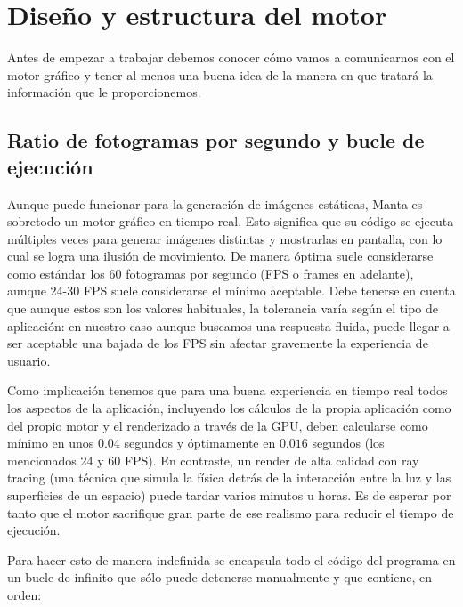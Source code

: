 \section{Diseño y estructura del motor}

Antes de empezar a trabajar debemos conocer cómo vamos a comunicarnos con el motor gráfico y tener al menos una buena idea de la manera en que tratará la información que le proporcionemos.

\subsection{Ratio de fotogramas por segundo y bucle de ejecución}
\label{fps_bucle_ejecucion}
Aunque puede funcionar para la generación de imágenes estáticas, Manta es sobretodo un motor gráfico en tiempo real. Esto significa que su código se ejecuta múltiples veces para generar imágenes distintas y mostrarlas en pantalla, con lo cual se logra una ilusión de movimiento. De manera óptima suele considerarse como estándar los 60 fotogramas por segundo\cite{vsync_nvidia} (FPS o frames en adelante), aunque 24-30 FPS suele considerarse el mínimo aceptable. Debe tenerse en cuenta que aunque estos son los valores habituales, la tolerancia varía según el tipo de aplicación: en nuestro caso aunque buscamos una respuesta fluida, puede llegar a ser aceptable una bajada de los FPS sin afectar gravemente la experiencia de usuario.

Como implicación tenemos que para una buena experiencia en tiempo real todos los aspectos de la aplicación, incluyendo los cálculos de la propia aplicación como del propio motor y el renderizado a través de la GPU, deben calcularse como mínimo en unos $0.04$ segundos y óptimamente en $0.016$ segundos (los mencionados 24 y 60 FPS). En contraste, un render de alta calidad con ray tracing (una técnica que simula la física detrás de la interacción entre la luz y las superficies de un espacio) puede tardar varios minutos u horas\cite{nvidia_raytr}. Es de esperar por tanto que el motor sacrifique gran parte de ese realismo para reducir el tiempo de ejecución.

Para hacer esto de manera indefinida se encapsula todo el código del programa en un bucle de infinito que sólo puede detenerse manualmente y que contiene, en orden:

